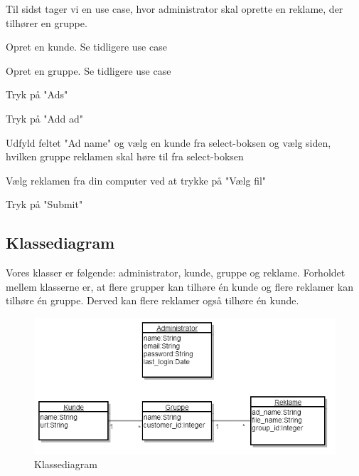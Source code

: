 \documentclass[a4paper,12pt]{article}
\begin{document}
Til sidst tager vi en use case, hvor administrator skal oprette en reklame, der tilhører en gruppe.
\begin{usecase}
 {
	\item Opret en kunde. Se tidligere use case
	\item Opret en gruppe. Se tidligere use case
	\item Tryk på "Ads"
	\item Tryk på "Add ad"
	\item Udfyld feltet "Ad name" og vælg en kunde fra select-boksen og vælg siden, hvilken gruppe reklamen skal høre til fra select-boksen
	\item Vælg reklamen fra din computer ved at trykke på "Vælg fil"
	\item Tryk på "Submit"
}
\end{usecase}

\subsection{Klassediagram}
Vores klasser er følgende: administrator, kunde, gruppe og reklame. Forholdet mellem klasserne er, at flere grupper kan tilhøre én kunde og flere reklamer kan tilhøre én gruppe. Derved kan flere reklamer også tilhøre én kunde.

\begin{figure}[h!]
  \centering
    \includegraphics[scale=0.5]{klasse_diagram.png}
  \caption{Klassediagram}
\end{figure}
\end{document}
